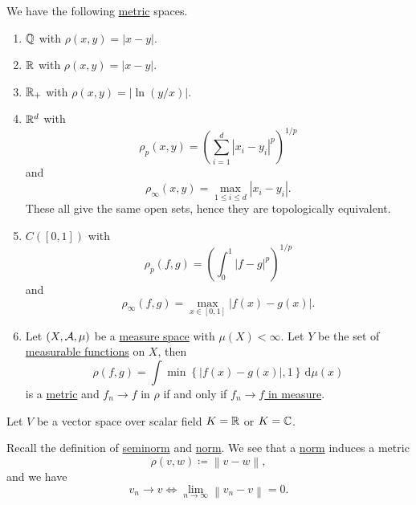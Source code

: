 \begin{eg}
	We have the following \hyperref[def:metric]{metric} spaces.
	\begin{enumerate}[(1)]
		\item \(\mathbb{\MakeUppercase{q}}\) with \(\rho (x, y) = \left\vert x - y \right\vert \).
		\item \(\mathbb{\MakeUppercase{r}}\) with \(\rho (x, y) = \left\vert x - y \right\vert \).
		\item \(\mathbb{\MakeUppercase{r}}_+\) with \(\rho (x, y) = \left\vert \ln (y / x)\right\vert \).
		\item \(\mathbb{\MakeUppercase{r}}^d\) with
		      \[
			      \rho _p(x, y) = \left(\sum\limits_{i=1}^{d} \left\vert x_{i} - y_{i} \right\vert^p \right)^{1 / p}
		      \]
		      and
		      \[
			      \rho _\infty (x, y ) = \mathop{\max} _{1\leq i\leq d}\left\vert x_{i} - y_{i} \right\vert.
		      \]
		      These all give the same open sets, hence they are topologically equivalent.
		\item \(C([0, 1])\) with
		      \[
			      \rho _p(f, g) = \left(\int _0^1 \left\vert f-g \right\vert^p \right)^{1 / p}
		      \]
		      and
		      \[
			      \rho _\infty (f, g) = \mathop{\max} _{x\in[0, 1]}\left\vert f(x) - g(x) \right\vert.
		      \]
		\item Let \((X, \mathcal{\MakeUppercase{a}} , \mu )\) be a \hyperref[def:measure-space]{measure space} with \(\mu (X)< \infty \). Let \(Y\) be the set of
		      \hyperref[def:measurable-function]{measurable functions} on \(X\), then
		      \[
			      \rho (f, g) = \int \mathop{\min} \left\{\left\vert f(x) - g(x) \right\vert, 1 \right\}\,\mathrm{d} \mu (x)
		      \]
		      is a \hyperref[def:metric]{metric} and \(f_{n} \to f\) in \(\rho\) if and only if \hyperref[def:converge-in-measure]{\(f_n \to f\) in measure}.
	\end{enumerate}
\end{eg}

Let \(V\) be a vector space over scalar field \(K = \mathbb{\MakeUppercase{r}} \) or \(K = \mathbb{\MakeUppercase{c}} \).
\begin{prev}\label{induced-metric}
	Recall the definition of \hyperref[def:seminorm]{seminorm} and \hyperref[def:norm]{norm}. We see that a \hyperref[def:norm]{norm} induces a metric
	\[
		\rho (v, w) \coloneqq \left\lVert v - w\right\rVert,
	\]
	and we have
	\[
		v_{n} \to v \iff \lim\limits_{n \to \infty} \left\lVert v_{n} - v\right\rVert = 0.
	\]
\end{prev}

